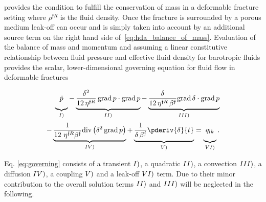 provides the condition to fulfill the conservation of mass in a deformable fracture setting where $\rho^{\mathfrak{f}R}$ is the fluid density. Once the fracture is surrounded by a porous medium leak-off can occur and is simply taken into account by an additional source term on the right hand side of~\eqref{eq:hda_balance_of_mass}.
Evaluation of the balance of mass and momentum and assuming a linear constitutive relationship between fluid pressure and effective fluid density for barotropic fluids provides the scalar, lower-dimensional governing equation for fluid flow in deformable fractures

\begin{align}
\label{eq:governing}
\begin{split}  
\underbrace{\vphantom{\frac{1}{12 \,\eta^{\mathfrak{f}R}\, \beta^{\mathfrak{f}}} \pderiv{}{x}\left(\delta^2 \pderiv{p}{x}\right)} 
\dot{p}}_{\MakeUppercase{\romannumeral 1{)}}} 
- 
\underbrace{\vphantom{\frac{1}{12 \,\eta^{\mathfrak{f}R}\, \beta^\mathfrak{f}} \pderiv
{}{r}\left(\delta^2 \pderiv{p}{r}\right)} \frac{\delta^2}{12 \,\eta^{\mathfrak{f}R}} \, \text{grad} \,p \cdot \text{grad} \, p}_{\MakeUppercase{\romannumeral 2{)}}}  
- 
\underbrace {\vphantom{\frac{1}{12 \,\eta^{\mathfrak{f}R} \,\beta^{\mathfrak{f}} } \pderiv{}{x}\left(\delta^2 \pderiv{p}{x}\right)} \frac{\delta }{12\, \eta^{\mathfrak{f}R}\, \beta^{\mathfrak{f}}} \text{grad} \, \delta \cdot \text{grad} \, p}_{\MakeUppercase{\romannumeral 3{)}}}
\\
- 
\underbrace{\frac{1}{12\,\, \eta^{\mathfrak{f}R} \beta^{\mathfrak{f}}} \text{div} \left( \delta^2 \, \text{grad} \, p\right)}_{\MakeUppercase{\romannumeral 4{)}}} 
+ 
\underbrace{\vphantom{\frac{1}{12\,r\, \eta^{\mathfrak{f}R}\, \beta^{\mathfrak{f}}} \pderiv{}{r}\left(\frac{\delta^2}{r} \pderiv{p}{x}\right)} \frac{1}{\delta\, \beta^{\mathfrak{f}}}\pderiv{\delta}{t}}_{\MakeUppercase{\romannumeral 5{)}}}
= 
\underbrace{\vphantom{\frac{1}{12\,r\, \eta^{\mathfrak{f}R}\, \beta^{\mathfrak{f}}} \pderiv{}{r}\left(\frac{\delta^2}{r} \pderiv{p}{x}\right)} q_{lk}}_{\MakeUppercase{\romannumeral 6{)}}}.
\end{split}
\end{align}

Eq. \eqref{eq:governing} consists of a transient $\MakeUppercase{\romannumeral 1{)}}$, a quadratic 
$\MakeUppercase{\romannumeral 2{)}}$, a convection $\MakeUppercase{\romannumeral 3{)}}$, a diffusion 
$\MakeUppercase{\romannumeral 4{)}}$, a coupling $\MakeUppercase{\romannumeral 5{)}}$ and a leak-off 
$\MakeUppercase{\romannumeral 6{)}}$ term. Due to their minor contribution to the overall solution terms $\MakeUppercase{\romannumeral 2{)}}$ and $\MakeUppercase{\romannumeral 3{)}}$ will be neglected in the following.

